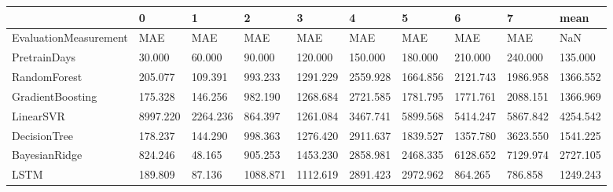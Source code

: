 \begin{tabular}{llllllllll}
\toprule
{} &        0 &        1 &        2 &        3 &        4 &        5 &        6 &        7 &     mean \\
\midrule
EvaluationMeasurement &      MAE &      MAE &      MAE &      MAE &      MAE &      MAE &      MAE &      MAE &      NaN \\
PretrainDays          &   30.000 &   60.000 &   90.000 &  120.000 &  150.000 &  180.000 &  210.000 &  240.000 &  135.000 \\
RandomForest          &  205.077 &  109.391 &  993.233 & 1291.229 & 2559.928 & 1664.856 & 2121.743 & 1986.958 & 1366.552 \\
GradientBoosting      &  175.328 &  146.256 &  982.190 & 1268.684 & 2721.585 & 1781.795 & 1771.761 & 2088.151 & 1366.969 \\
LinearSVR             & 8997.220 & 2264.236 &  864.397 & 1261.084 & 3467.741 & 5899.568 & 5414.247 & 5867.842 & 4254.542 \\
DecisionTree          &  178.237 &  144.290 &  998.363 & 1276.420 & 2911.637 & 1839.527 & 1357.780 & 3623.550 & 1541.225 \\
BayesianRidge         &  824.246 &   48.165 &  905.253 & 1453.230 & 2858.981 & 2468.335 & 6128.652 & 7129.974 & 2727.105 \\
LSTM                  &  189.809 &   87.136 & 1088.871 & 1112.619 & 2891.423 & 2972.962 &  864.265 &  786.858 & 1249.243 \\
\bottomrule
\end{tabular}
